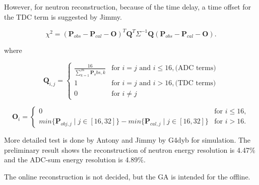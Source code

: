 %
%
%
%
%


However, for neutron reconstruction, because of the time delay, a time offset
for the TDC term is suggested by Jimmy.



\begin{equation}
\label{eq:fitnessChiTimeOffset}
\chi^{2} = (\mathbf{P}_{obs} - \mathbf{P}_{cal} - \mathbf{O})^T\mathbf{Q}^T\Sigma^{-1}\mathbf{Q}(\mathbf{P}_{obs} - \mathbf{P}_{cal} - \mathbf{O}).
\end{equation}

where

\begin{equation}
\label{eq:fitnessQTimeOffset}
\mathbf{Q}_{i,j}
= \left\{
    \begin{array}{lll}
        \frac{16}{\sum^16_{k=1}\mathbf{P}_obs,k} & \mbox{for } i=j \mbox{ and } i\leq16, \mbox{(ADC terms)} \\
        1 & \mbox{for } i=j \mbox{ and } i>16, \mbox{(TDC terms)} \\
        0 & \mbox{for } i{\neq}j
    \end{array} \right.
\end{equation}

\begin{equation}
\label{eq:fitnessOTimeOffset}
\mathbf{O}_i =
\left\{
    \begin{array}{ll}
    0 & \mbox{for } i\leq16, \\
    min\{\mathbf{P}_{obj,j}{\mid}j\in[16,32]\} - min\{\mathbf{P}_{cal,j}{\mid}j\in[16,32]\}  & \mbox{for } i>16.
    \end{array} \right.
\end{equation}


More detailed test is done by Antony and Jimmy by G4dyb for simulation.
The preliminary result shows the reconstruction of neutron energy resolution is 4.47\%
and the ADC-sum energy resolution is 4.89\%.


The online reconstruction is not decided, but the GA is intended for
the offline.
